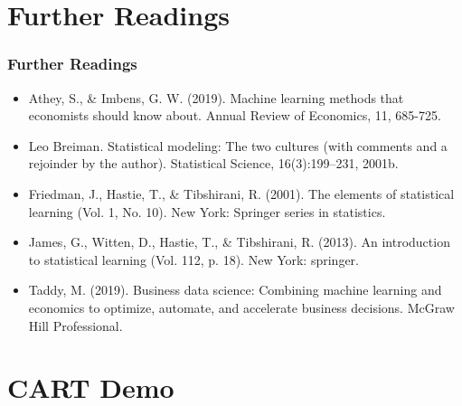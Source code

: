 \documentclass[
  shownotes,
  xcolor={svgnames},
  hyperref={colorlinks,citecolor=DarkBlue,linkcolor=DarkRed,urlcolor=DarkBlue}
  , aspectratio=169]{beamer}
\begin{document}
\section{Further Readings}
\begin{frame}
\frametitle{Further Readings}

\begin{itemize}
\scriptsize
  \item Athey, S., \& Imbens, G. W. (2019). Machine learning methods that economists should know about. Annual Review of Economics, 11, 685-725.
  \medskip
  \item Leo Breiman. Statistical modeling: The two cultures (with comments and a rejoinder by the author). Statistical Science, 16(3):199–231, 2001b.
  \medskip
  \item Friedman, J., Hastie, T., \& Tibshirani, R. (2001). The elements of statistical learning (Vol. 1, No. 10). New York: Springer series in statistics.
  \medskip
  \item James, G., Witten, D., Hastie, T., \& Tibshirani, R. (2013). An introduction to statistical learning (Vol. 112, p. 18). New York: springer.
  \medskip
  \item Taddy, M. (2019). Business data science: Combining machine learning and economics to optimize, automate, and accelerate business decisions. McGraw Hill Professional.
  
  
\end{itemize}

\end{frame}
\appendix
{}
\setcounter{finalframe}{\value{framenumber}}
\normalsize
\section{CART Demo}
\end{document}
